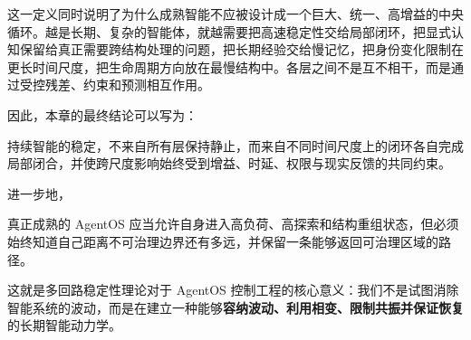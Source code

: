 这一定义同时说明了为什么成熟智能不应被设计成一个巨大、统一、高增益的中央循环。越是长期、复杂的智能体，就越需要把高速稳定性交给局部闭环，把显式认知保留给真正需要跨结构处理的问题，把长期经验交给慢记忆，把身份变化限制在更长时间尺度，把生命周期方向放在最慢结构中。各层之间不是互不相干，而是通过受控残差、约束和预测相互作用。

因此，本章的最终结论可以写为：
\begin{conclusion}
持续智能的稳定，不来自所有层保持静止，而来自不同时间尺度上的闭环各自完成局部闭合，并使跨尺度影响始终受到增益、时延、权限与现实反馈的共同约束。
\end{conclusion}

进一步地，
\begin{statementbox}
真正成熟的 AgentOS 应当允许自身进入高负荷、高探索和结构重组状态，但必须始终知道自己距离不可治理边界还有多远，并保留一条能够返回可治理区域的路径。
\end{statementbox}

这就是多回路稳定性理论对于 AgentOS 控制工程的核心意义：我们不是试图消除智能系统的波动，而是在建立一种能够\textbf{容纳波动、利用相变、限制共振并保证恢复}的长期智能动力学。

